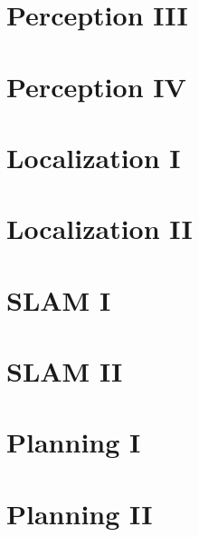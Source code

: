 \documentclass[8pt,landscape]{article}
\begin{document}
\begin{multicols}{3}
\blindtext[3]

\section{Perception III}

\blindtext[3]

\section{Perception IV}

\blindtext[3]

\section{Localization I}

\blindtext[3]

\section{Localization II}

\blindtext[3]

\section{SLAM I}

\blindtext[3]

\section{SLAM II}

\blindtext[3]

\section{Planning I}

\blindtext[3]

\section{Planning II}

\blindtext[3]





\end{multicols}

\end{document}
